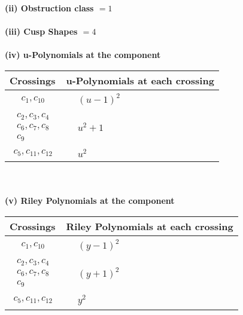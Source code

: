 \documentclass[1p]{elsarticle_modified}
\theoremstyle{definition}
\begin{document}
\flushleft \textbf{(ii) Obstruction class $= 1$}\\~\\
\flushleft \textbf{(iii) Cusp Shapes $= 4$}\\~\\
\newpage\renewcommand{\arraystretch}{1}
\flushleft \textbf{(iv) u-Polynomials at the component}\newline \\
\begin{tabular}{m{50pt}|m{274pt}}
Crossings & \hspace{64pt}u-Polynomials at each crossing \\
\hline $$\begin{aligned}c_{1},c_{10}\end{aligned}$$&$\begin{aligned}
&(u-1)^2
\end{aligned}$\\
\hline $$\begin{aligned}c_{2},c_{3},c_{4}\\c_{6},c_{7},c_{8}\\c_{9}\end{aligned}$$&$\begin{aligned}
&u^2+1
\end{aligned}$\\
\hline $$\begin{aligned}c_{5},c_{11},c_{12}\end{aligned}$$&$\begin{aligned}
&u^2
\end{aligned}$\\
\hline
\end{tabular}\\~\\
\newpage\renewcommand{\arraystretch}{1}
\flushleft \textbf{(v) Riley Polynomials at the component}\newline \\
\begin{tabular}{m{50pt}|m{274pt}}
Crossings & \hspace{64pt}Riley Polynomials at each crossing \\
\hline $$\begin{aligned}c_{1},c_{10}\end{aligned}$$&$\begin{aligned}
&(y-1)^2
\end{aligned}$\\
\hline $$\begin{aligned}c_{2},c_{3},c_{4}\\c_{6},c_{7},c_{8}\\c_{9}\end{aligned}$$&$\begin{aligned}
&(y+1)^2
\end{aligned}$\\
\hline $$\begin{aligned}c_{5},c_{11},c_{12}\end{aligned}$$&$\begin{aligned}
&y^2
\end{aligned}$\\
\hline
\end{tabular}\\~\\
\end{document}

